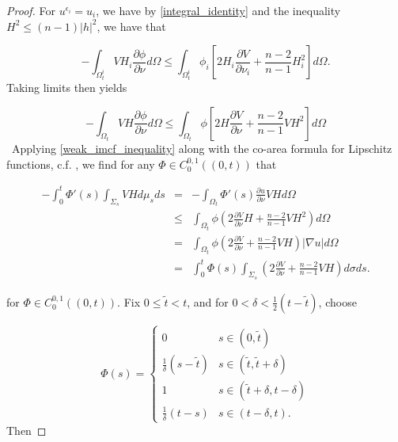 \documentclass[12pt,twoside]{article}
\theoremstyle{plain}
\theoremstyle{definition}
\theoremstyle{remark}
\renewcommand{\tilde}{\widetilde}
\numberwithin{equation}{section}
\begin{document}
\begin{proof}
For $u^{\epsilon_{i}}=u_{i}$, we have by \eqref{integral_identity} and the inequality $H^{2} \leq (n-1) |h|^{2}$, we have that

\begin{equation*}
    -\int_{\Omega^{i}_{t}} VH_{i} \frac{\partial \phi}{\partial \nu} d\Omega \leq \int_{\Omega^{i}_{t}} \phi_{i} [ 2 H_{i} \frac{\partial V}{\partial \nu_{i}} + \frac{n-2}{n-1} H_{i}^{2}] d\Omega.
\end{equation*}
Taking limits then yields

\begin{equation} \label{weak_imcf_inequality}
    -\int_{\Omega_{t}} VH \frac{\partial \phi}{\partial \nu} d\Omega \leq \int_{\Omega_{t}} \phi[2H \frac{\partial V} {\partial \nu} + \frac{n-2}{n-1} VH^{2}] d\Omega
\end{equation}
\
Applying \eqref{weak_imcf_inequality} along with the co-area formula for Lipschitz functions, c.f. \cite{S18}, we find for any $\Phi \in C^{0,1}_{0}((0,t))$ that 

\begin{eqnarray*}
    -\int_{0}^{t} \Phi'(s) \int_{\Sigma_{s}} VH d\mu_{s} ds &=& - \int_{\Omega_{t}} \Phi'(s) \frac{\partial u}{\partial \nu} VH d\Omega \\
    &\leq& \int_{\Omega_{t}} \phi \left( 2 \frac{\partial V}{\partial \nu} H + \frac{n-2}{n-1} VH^{2} \right) d\Omega \\
    &=& \int_{\Omega_{t}} \phi \left( 2 \frac{\partial V}{\partial \nu} + \frac{n-2}{n-1} VH \right) |\nabla u| d\Omega \\
    &=& \int_{0}^{t} \Phi(s) \int_{\Sigma_{s}} \left( 2 \frac{\partial V}{\partial \nu} + \frac{n-2}{n-1} VH \right) d\sigma ds.
\end{eqnarray*}

for $\Phi \in C^{0,1}_{0}((0,t))$. Fix $0 \leq \tilde{t} < t$, and for $0 < \delta < \frac{1}{2} (t-\tilde{t}) $, choose

\begin{equation*}
    \Phi(s) = \begin{cases} 0 & s \in (0,\tilde{t})  \\
    \frac{1}{\delta} (s- \tilde{t}) & s \in (\tilde{t}, \tilde{t} + \delta) \\
    1 & s \in (\tilde{t} + \delta, t - \delta) \\
    \frac{1}{\delta} (t-s) & s \in (t - \delta, t).
    
    \end{cases}
\end{equation*}
Then 


\end{proof}
\end{document}
